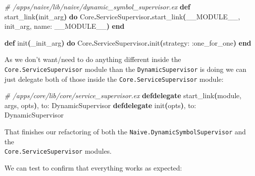 \documentclass[
  oneside]{book}
\newenvironment{Shaded}{\begin{snugshade}}{\end{snugshade}}
\newcommand{\CommentTok}[1]{\textcolor[rgb]{0.56,0.35,0.01}{\textit{#1}}}
\newcommand{\ConstantTok}[1]{\textcolor[rgb]{0.56,0.35,0.01}{#1}}
\newcommand{\FunctionTok}[1]{\textcolor[rgb]{0.13,0.29,0.53}{\textbf{#1}}}
\newcommand{\KeywordTok}[1]{\textcolor[rgb]{0.13,0.29,0.53}{\textbf{#1}}}
\newcommand{\NormalTok}[1]{#1}
\newcommand{\OperatorTok}[1]{\textcolor[rgb]{0.81,0.36,0.00}{\textbf{#1}}}
\newcommand{\VariableTok}[1]{\textcolor[rgb]{0.00,0.00,0.00}{#1}}
\begin{document}
\begin{Shaded}
\begin{Highlighting}[]
  \CommentTok{\# /apps/naive/lib/naive/dynamic\_symbol\_supervisor.ex}
  \KeywordTok{def}\NormalTok{ start\_link}\FunctionTok{(}\NormalTok{init\_arg}\FunctionTok{)} \KeywordTok{do}
    \ConstantTok{Core}\OperatorTok{.}\ConstantTok{ServiceSupervisor}\OperatorTok{.}\NormalTok{start\_link}\FunctionTok{(}\ConstantTok{\_\_MODULE\_\_}\NormalTok{, init\_arg, }\VariableTok{name:} \ConstantTok{\_\_MODULE\_\_}\FunctionTok{)}
  \KeywordTok{end}

  \KeywordTok{def}\NormalTok{ init}\FunctionTok{(}\NormalTok{\_init\_arg}\FunctionTok{)} \KeywordTok{do}
    \ConstantTok{Core}\OperatorTok{.}\ConstantTok{ServiceSupervisor}\OperatorTok{.}\NormalTok{init}\FunctionTok{(}\VariableTok{strategy:} \VariableTok{:one\_for\_one}\FunctionTok{)}
  \KeywordTok{end}
\end{Highlighting}
\end{Shaded}

As we don't want/need to do anything different inside the \texttt{Core.ServiceSupervisor} module than the \texttt{DynamicSupervisor} is doing we can just delegate both of those inside the \texttt{Core.ServiceSupervisor} module:

\begin{Shaded}
\begin{Highlighting}[]
  \CommentTok{\# /apps/core/lib/core/service\_supervisor.ex}
  \KeywordTok{defdelegate}\NormalTok{ start\_link}\FunctionTok{(}\NormalTok{module, args, opts}\FunctionTok{)}\NormalTok{, }\VariableTok{to:} \ConstantTok{DynamicSupervisor}
  \KeywordTok{defdelegate}\NormalTok{ init}\FunctionTok{(}\NormalTok{opts}\FunctionTok{)}\NormalTok{, }\VariableTok{to:} \ConstantTok{DynamicSupervisor}
\end{Highlighting}
\end{Shaded}

That finishes our refactoring of both the \texttt{Naive.DynamicSymbolSupervisor} and the\\
\texttt{Core.ServiceSupervisor} modules.

We can test to confirm that everything works as expected:
\end{document}
